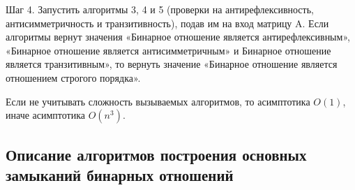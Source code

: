 \documentclass[spec, och, labwork]{shiza}
\begin{document}
\begin{enumerate}
                Шаг 4. Запустить алгоритмы 3, 4 и 5 (проверки на антирефлексивность, антисимметричность и транзитивность), подав им на вход матрицу A. Если алгоритмы вернут значения «Бинарное отношение является антирефлексивным», «Бинарное отношение является антисимметричным» и Бинарное отношение является транзитивным», то вернуть значение «Бинарное отношение является отношением строгого порядка».

                Если не учитывать сложность вызываемых алгоритмов, то асимптотика $O(1)$, иначе асимптотика $O(n^3)$.

            \end{enumerate}
        
        \subsection{Описание алгоритмов построения основных замыканий бинарных отношений}
\end{document}
